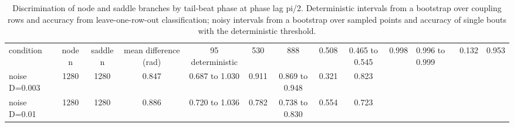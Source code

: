 \begin{table}
\caption{Discrimination of node and saddle branches by tail-beat phase at phase lag pi/2. Deterministic intervals from a bootstrap over coupling rows and accuracy from leave-one-row-out classification; noisy intervals from a bootstrap over sampled points and accuracy of single bouts with the deterministic threshold.}
\label{tab:T_phase_discrimination}
\begin{ruledtabular}
\begin{tabular}{lcccccccc}
condition & node n & saddle n & mean difference (rad) & 95%
\hline
deterministic & 530 & 888 & 0.508 & 0.465 to 0.545 & 0.998 & 0.996 to 0.999 & 0.132 & 0.953 \\
noise D=0.003 & 1280 & 1280 & 0.847 & 0.687 to 1.030 & 0.911 & 0.869 to 0.948 & 0.321 & 0.823 \\
noise D=0.01 & 1280 & 1280 & 0.886 & 0.720 to 1.036 & 0.782 & 0.738 to 0.830 & 0.554 & 0.723 \\
\end{tabular}
\end{ruledtabular}
\end{table}
